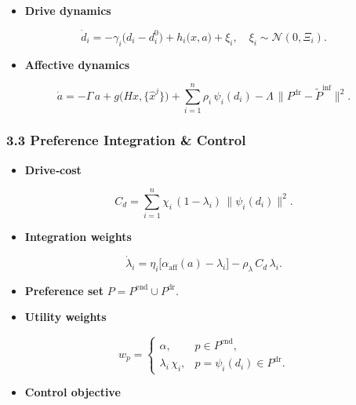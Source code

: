 \documentclass[
]{article}
\providecommand{\tightlist}{%
  \setlength{\itemsep}{0pt}\setlength{\parskip}{0pt}}
\begin{document}
\begin{itemize}
\tightlist
\item
  \textbf{Drive dynamics}
\end{itemize}

\[ \dot d_i = -\gamma_i\bigl(d_i - d^0_i\bigr) + h_i\bigl(x,a\bigr) + \xi_i,\quad \xi_i\sim\mathcal N(0,\Xi_i). \]

\begin{itemize}
\tightlist
\item
  \textbf{Affective dynamics}
\end{itemize}

\[ \dot a = -\Gamma\,a + g\bigl(Hx,\{\hat x^j\}\bigr) + \sum_{i=1}^n \rho_i\,\psi_i(d_i) - \Lambda\,\bigl\|P^{\mathrm{dr}} - \tilde P^{\mathrm{inf}}\bigr\|^2. \]

\hypertarget{33-preference-integration--control}{%
\subsubsection{3.3 Preference Integration \&
Control}\label{33-preference-integration--control}}

\begin{itemize}
\tightlist
\item
  \textbf{Drive‐cost}
\end{itemize}

\[ C_d = \sum_{i=1}^n \chi_i\,(1-\lambda_i)\,\|\psi_i(d_i)\|^2. \]

\begin{itemize}
\tightlist
\item
  \textbf{Integration weights}
\end{itemize}

\[ \dot\lambda_i = \eta_i\bigl[\alpha_{\mathrm{aff}}(a)-\lambda_i\bigr] - \rho_\lambda\,C_d\,\lambda_i. \]

\begin{itemize}
\item
  \textbf{Preference set} \(P = P^{\mathrm{end}}\cup P^{\mathrm{dr}}.\)
\item
  \textbf{Utility weights}
\end{itemize}

\[ w_p = \begin{cases} \alpha, & p\in P^{\mathrm{end}},\\ \lambda_i\,\chi_i, & p=\psi_i(d_i)\in P^{\mathrm{dr}}. \end{cases} \]

\begin{itemize}
\tightlist
\item
  \textbf{Control objective}
\end{itemize}
\end{document}

